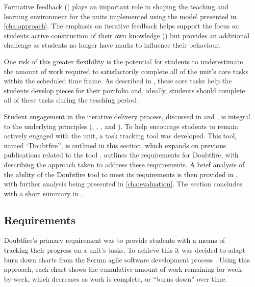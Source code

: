 Formative feedback () plays an important role in shaping the teaching and learning environment for the units implemented using the model presented in \cref{cha:approach}. The emphasis on iterative feedback helps support the focus on students active construction of their own knowledge 
() but provides an additional challenge as students no longer have marks to influence their behaviour. 

One risk of this greater flexibility is the potential for students to underestimate the amount of work required to satisfactorily complete all of the unit's core tasks within the scheduled time frame. As described in , these core tasks help the students develop pieces for their portfolio and, ideally, students should complete all of these tasks during the teaching period. 

Student engagement in the iterative delivery process, discussed in  and , is integral to the underlying principles (, , , and ). To help encourage students to remain actively engaged with the unit, a task tracking tool was developed. This tool, named ``Doubtfire'', is outlined in this section, which expands on previous publications related to the tool \cite{Cain:2013b,Woodward:2013}.  outlines the requirements for Doubtfire, with  describing the approach taken to address these requirements. A brief analysis of the ability of the Doubtfire tool to meet its requirements is then provided in , with further analysis being presented in \cref{cha:evaluation}. The section concludes with a short summary in .


\subsection{Requirements} %
\label{sub:doubtfire_requirements}

Doubtfire's primary requirement was to provide students with a means of tracking their progress on a unit's tasks. To achieve this it was decided to adapt burn down charts from the Scrum agile software development process \cite{Schwaber:2002}. Using this approach, each chart shows the cumulative amount of work remaining for week-by-week, which decreases as work is complete, or ``burns down'' over time.

